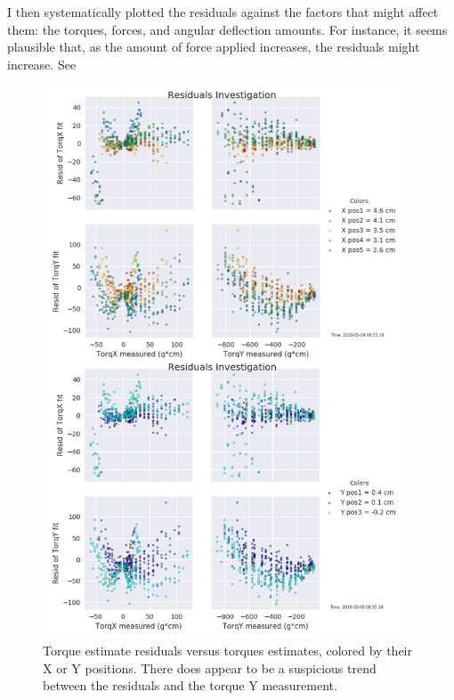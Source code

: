 \documentclass[preprint,12pt,3p]{elsarticle}
\begin{document}
I then systematically plotted the residuals against the factors that might 
affect them: the torques, forces, and angular deflection amounts. For instance, it seems plausible
that, as the amount of force applied increases, the residuals might increase. See 


\begin{figure}[p!]
\centering
\includegraphics[width=0.95\textwidth]{images/round1/resids_Torq.png}
\caption{Torque estimate residuals versus torques estimates, colored by their X or Y positions.
There does appear to be a suspicious trend between the residuals and the torque Y measurement.}
\label{fig:figura1}
\end{figure}

\end{document}
